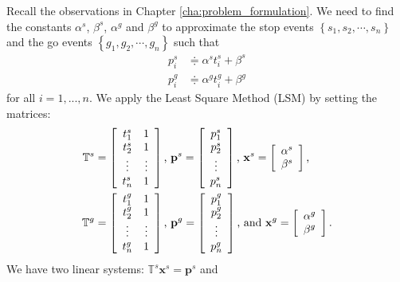 \documentclass[final,oneside,onecolumn,12pt,a4paper]{book}%
\begin{document}
Recall the observations in Chapter \ref{cha:problem_formulation}. We need to
find the constants $\alpha^{s}$, $\beta^{s}$, $\alpha^{g}$ and $\beta^{g}$ to
approximate the stop events $\left\{  s_{1},s_{2},\cdots,s_{n}\right\}  $ and
the go events $\left\{  g_{1},g_{2},\cdots,g_{n}\right\}  $ such that%
\begin{align*}
p_{i}^{s}  &  \doteqdot\alpha^{s}t_{i}^{s}+\beta^{s}\\
p_{i}^{g}  &  \doteqdot\alpha^{g}t_{i}^{g}+\beta^{g}%
\end{align*}
for all $i=1,...,n$. We apply the Least Square Method (LSM) by setting the
matrices:
\begin{align*}
\mathbb{T}^{s}  &  =\left[
\begin{array}
[c]{cc}%
t_{1}^{s} & 1\\
t_{2}^{s} & 1\\
\vdots & \vdots\\
t_{n}^{s} & 1
\end{array}
\right]  \text{, }\mathbf{p}^{s}=\left[
\begin{array}
[c]{c}%
p_{1}^{s}\\
p_{2}^{s}\\
\vdots\\
p_{n}^{s}%
\end{array}
\right]  \text{, }\mathbf{x}^{s}=\left[
\begin{array}
[c]{c}%
\alpha^{s}\\
\beta^{s}%
\end{array}
\right]  \text{,}\\
\mathbb{T}^{g}  &  =\left[
\begin{array}
[c]{cc}%
t_{1}^{g} & 1\\
t_{2}^{g} & 1\\
\vdots & \vdots\\
t_{n}^{g} & 1
\end{array}
\right]  \text{, }\mathbf{p}^{g}=\left[
\begin{array}
[c]{c}%
p_{1}^{g}\\
p_{2}^{g}\\
\vdots\\
p_{n}^{g}%
\end{array}
\right]  \text{, and }\mathbf{x}^{g}=\left[
\begin{array}
[c]{c}%
\alpha^{g}\\
\beta^{g}%
\end{array}
\right]  \text{.}%
\end{align*}
We have two linear systems: $\mathbb{T}^{s}\mathbf{x}^{s}=\mathbf{p}^{s}$ and
\end{document}
